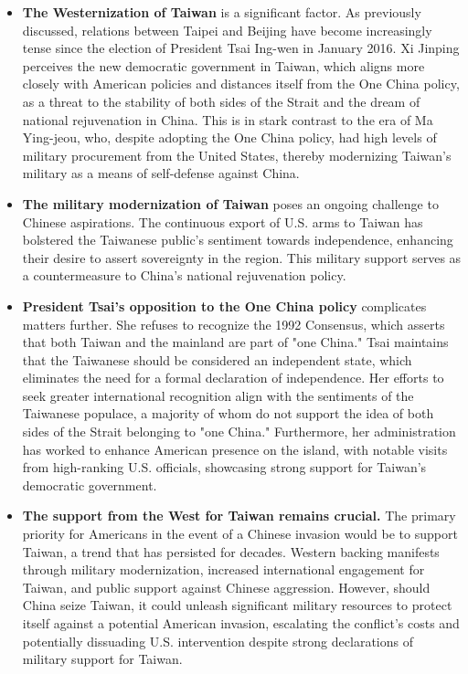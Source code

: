 \documentclass{article}
\begin{document}
\begin{itemize}
    \item \textbf{The Westernization of Taiwan} is a significant factor. As previously discussed, relations between Taipei and Beijing have become increasingly tense since the election of President Tsai Ing-wen in January 2016. Xi Jinping perceives the new democratic government in Taiwan, which aligns more closely with American policies and distances itself from the One China policy, as a threat to the stability of both sides of the Strait and the dream of national rejuvenation in China. This is in stark contrast to the era of Ma Ying-jeou, who, despite adopting the One China policy, had high levels of military procurement from the United States, thereby modernizing Taiwan's military as a means of self-defense against China.
    \item \textbf{The military modernization of Taiwan} poses an ongoing challenge to Chinese aspirations. The continuous export of U.S. arms to Taiwan has bolstered the Taiwanese public’s sentiment towards independence, enhancing their desire to assert sovereignty in the region. This military support serves as a countermeasure to China's national rejuvenation policy.
    \item \textbf{President Tsai's opposition to the One China policy} complicates matters further. She refuses to recognize the 1992 Consensus, which asserts that both Taiwan and the mainland are part of "one China." Tsai maintains that the Taiwanese should be considered an independent state, which eliminates the need for a formal declaration of independence. Her efforts to seek greater international recognition align with the sentiments of the Taiwanese populace, a majority of whom do not support the idea of both sides of the Strait belonging to "one China." Furthermore, her administration has worked to enhance American presence on the island, with notable visits from high-ranking U.S. officials, showcasing strong support for Taiwan's democratic government.
    \item \textbf{The support from the West for Taiwan remains crucial.} The primary priority for Americans in the event of a Chinese invasion would be to support Taiwan, a trend that has persisted for decades. Western backing manifests through military modernization, increased international engagement for Taiwan, and public support against Chinese aggression. However, should China seize Taiwan, it could unleash significant military resources to protect itself against a potential American invasion, escalating the conflict's costs and potentially dissuading U.S. intervention despite strong declarations of military support for Taiwan.

\end{itemize}
\end{document}
